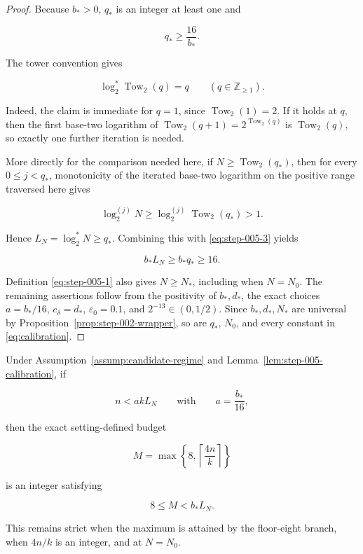 \begin{proof}
Because \(b_*>0\), \(q_*\) is an integer at least one and

\[
q_*\ge\frac{16}{b_*}.
\tag{S5.3}\label{eq:step-005-3}
\]

The tower convention gives

\[
\log_2^*\operatorname{Tow}_2(q)=q
\qquad(q\in\mathbb Z_{\ge1}).
\tag{S5.4}\label{eq:step-005-4}
\]

Indeed, the claim is immediate for \(q=1\), since
\(\operatorname{Tow}_2(1)=2\). If it holds at \(q\), then the first
base-two logarithm of
\(\operatorname{Tow}_2(q+1)=2^{\operatorname{Tow}_2(q)}\) is
\(\operatorname{Tow}_2(q)\), so exactly one further iteration is needed.

More directly for the comparison needed here, if
\(N\ge\operatorname{Tow}_2(q_*)\), then for every
\(0\le j<q_*\), monotonicity of the iterated base-two logarithm on the
positive range traversed here gives

\[
\log_2^{(j)}N
\ge
\log_2^{(j)}\operatorname{Tow}_2(q_*)
>1.
\]

Hence \(L_N=\log_2^*N\ge q_*\). Combining this with \eqref{eq:step-005-3} yields

\[
b_*L_N\ge b_*q_*\ge16.
\tag{S5.5}\label{eq:step-005-5}
\]

Definition \eqref{eq:step-005-1} also gives \(N\ge N_*\), including when \(N=N_0\).
The remaining assertions follow from the positivity of
\(b_*,d_*\), the exact choices
\(a=b_*/16\), \(c_\delta=d_*\), \(\varepsilon_0=0.1\), and
\(2^{-13}\in(0,1/2)\). Since \(b_*,d_*,N_*\) are universal by
Proposition~\ref{prop:step-002-wrapper},
so are \(q_*\), \(N_0\), and every constant in
\eqref{eq:calibration}. \end{proof}

\begin{lemma}\label{lem:step-005-budget}
Under Assumption~\ref{assump:candidate-regime} and
Lemma~\ref{lem:step-005-calibration}, if

\[
n<akL_N
\qquad\text{with}\qquad a=\frac{b_*}{16},
\]

then the exact setting-defined budget

\[
M=\max\left\{8,\left\lceil\frac{4n}{k}\right\rceil\right\}
\]

is an integer satisfying

\[
8\le M<b_*L_N.
\tag{S5.6}\label{eq:step-005-6}
\]

This remains strict when the maximum is attained by the floor-eight
branch, when \(4n/k\) is an integer, and at \(N=N_0\).
\end{lemma}

